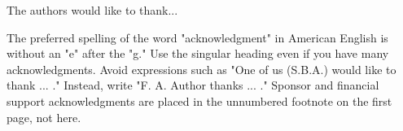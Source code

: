 \documentclass[journal]{IAENGtran}
\begin{document}
The authors would like to thank...

The preferred spelling of the word "acknowledgment" in American
English is without an "e" after the "g." Use the singular heading
even if you have many acknowledgments. Avoid expressions such as
"One of us (S.B.A.) would like to thank ... ." Instead, write "F. A.
Author thanks ... ." Sponsor and financial support acknowledgments
are placed in the unnumbered footnote on the first page, not here.


\ifCLASSOPTIONcaptionsoff
  \newpage
\fi




\end{document}
